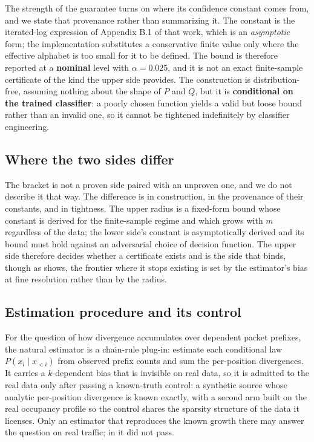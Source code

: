 The strength of the guarantee turns on where its confidence constant comes from,
and we state that provenance rather than summarizing it. The constant is the
iterated-log expression of Appendix B.1 of that work, which is an
\emph{asymptotic} form; the implementation substitutes a conservative finite
value only where the effective alphabet is too small for it to be defined. The
bound is therefore reported at a \textbf{nominal} level with $\alpha = 0.025$,
and it is not an exact finite-sample certificate of the kind the upper side
provides. The construction is distribution-free, assuming nothing about the shape
of $P$ and $Q$, but it is \textbf{conditional on the trained classifier}: a
poorly chosen function yields a valid but loose bound rather than an invalid one,
so it cannot be tightened indefinitely by classifier engineering.

\subsection{Where the two sides differ}
\label{sec:design/asymmetry}

The bracket is not a proven side paired with an unproven one, and we do not
describe it that way. The difference is in construction, in the provenance of
their constants, and in tightness. The upper radius is a fixed-form bound whose
constant is derived for the finite-sample regime and which grows with $m$
regardless of the data; the lower side's constant is asymptotically derived and
its bound must hold against an adversarial choice of decision function. The upper
side therefore decides whether a certificate exists and is the side that binds,
though as  shows, the frontier where it stops existing
is set by the estimator's bias at fine resolution rather than by the radius.

\subsection{Estimation procedure and its control}
\label{sec:design/estimator}

For the question of how divergence accumulates over dependent packet prefixes,
the natural estimator is a chain-rule plug-in: estimate each conditional law
$P(x_i \mid x_{<i})$ from observed prefix counts and sum the per-position
divergences. It carries a $k$-dependent bias that is invisible on real data, so
it is admitted to the real data only after passing a known-truth control: a
synthetic source whose analytic per-position divergence is known exactly, with a
second arm built on the real occupancy profile so the control shares the
sparsity structure of the data it licenses. Only an estimator that reproduces
the known growth there may answer the question on real traffic; in
 it did not pass.
